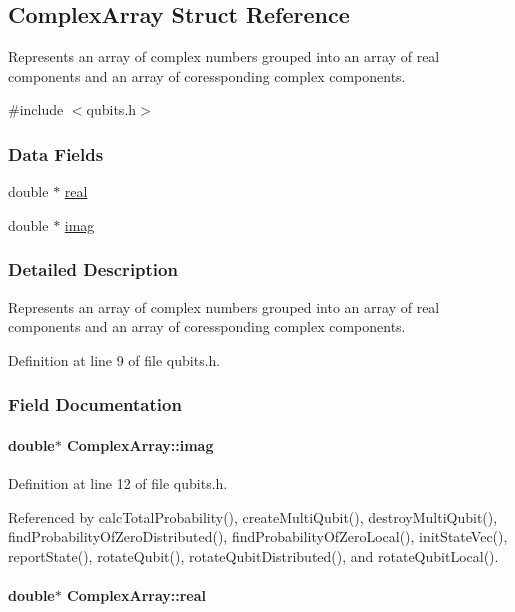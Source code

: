 \hypertarget{structComplexArray}{
\subsection{ComplexArray Struct Reference}
\label{structComplexArray}
}


Represents an array of complex numbers grouped into an array of real components and an array of coressponding complex components.  


{\ttfamily \#include $<$qubits.h$>$}\subsubsection*{Data Fields}
\begin{DoxyCompactItemize}
\item 
double $\ast$ \hyperlink{structComplexArray_a1cf9fd31d6dce5ef618d2bcf3e4f8b69}{real}
\item 
double $\ast$ \hyperlink{structComplexArray_aa409fd14e1ff3e1fdcc53cc4eb77a7a8}{imag}
\end{DoxyCompactItemize}


\subsubsection{Detailed Description}
Represents an array of complex numbers grouped into an array of real components and an array of coressponding complex components. 

Definition at line 9 of file qubits.h.

\subsubsection{Field Documentation}
\hypertarget{structComplexArray_aa409fd14e1ff3e1fdcc53cc4eb77a7a8}{
\paragraph[{imag}]{\setlength{\rightskip}{0pt plus 5cm}double$\ast$ {\bf ComplexArray::imag}}\hfill}
\label{structComplexArray_aa409fd14e1ff3e1fdcc53cc4eb77a7a8}


Definition at line 12 of file qubits.h.

Referenced by calcTotalProbability(), createMultiQubit(), destroyMultiQubit(), findProbabilityOfZeroDistributed(), findProbabilityOfZeroLocal(), initStateVec(), reportState(), rotateQubit(), rotateQubitDistributed(), and rotateQubitLocal().\hypertarget{structComplexArray_a1cf9fd31d6dce5ef618d2bcf3e4f8b69}{
\paragraph[{real}]{\setlength{\rightskip}{0pt plus 5cm}double$\ast$ {\bf ComplexArray::real}}\hfill}
\label{structComplexArray_a1cf9fd31d6dce5ef618d2bcf3e4f8b69}


